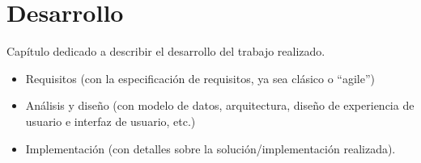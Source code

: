 \chapter{Desarrollo}
\label{ch:desarrollo}
Capítulo dedicado a describir el desarrollo del trabajo realizado.

\begin{itemize}
\item Requisitos (con la especificación de requisitos, ya sea clásico o ``agile'')
\item Análisis y diseño (con  modelo de datos, arquitectura, diseño de experiencia de usuario e interfaz de usuario, etc.)
\item Implementación (con detalles sobre la solución/implementación realizada).
\end{itemize}

